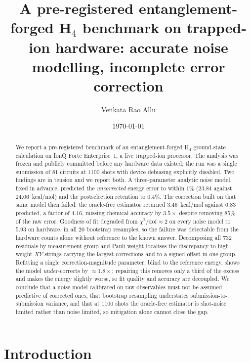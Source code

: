 \documentclass[aps,prx,twocolumn,superscriptaddress,nofootinbib,floatfix]{revtex4-2}
\begin{document}
\title{A pre-registered entanglement-forged H$_4$ benchmark on trapped-ion
hardware: accurate noise modelling, incomplete error correction}

\author{Venkata Rao Allu}

\date{\today}

\begin{abstract}
We report a pre-registered benchmark of an entanglement-forged H$_4$
ground-state calculation on IonQ Forte Enterprise~1, a live trapped-ion
processor. The analysis was frozen and publicly committed before any
hardware data existed; the run was a single submission of $81$ circuits at
$1100$ shots with device debiasing explicitly disabled. Two findings are in
tension and we report both. A three-parameter analytic noise model, fixed
in advance, predicted the \emph{uncorrected} energy error to within $1\%$
($23.84$ against $24.06$~kcal/mol) and the postselection retention to
$0.4\%$. The correction built on that same model then failed: the
oracle-free estimator returned $3.46$~kcal/mol against $0.83$ predicted, a
factor of $4.16$, missing chemical accuracy by $3.5\times$ despite removing
$85\%$ of the raw error. Goodness of fit degraded from
$\chi^2/\mathrm{dof}\approx2$ on every noise model to $5.93$ on hardware,
in all $20$ bootstrap resamples, so the failure was detectable from the
hardware counts alone without reference to the known answer. Decomposing
all $732$ residuals by measurement group and Pauli weight localises the
discrepancy to high-weight $XY$ strings carrying the largest corrections
and to a signed offset in one group. Refitting a single correction-magnitude
parameter, blind to the reference energy, shows the model
\emph{under}-corrects by $\approx1.8\times$; repairing this removes only a
third of the excess and makes the energy slightly worse, so fit quality and
accuracy are decoupled. We conclude that a noise model calibrated on raw
observables must not be assumed predictive of corrected ones, that
bootstrap resampling understates submission-to-submission variance, and
that at $1100$ shots the oracle-free estimator is shot-noise limited rather
than noise limited, so mitigation alone cannot close the gap.
\end{abstract}

\maketitle

\section{Introduction}
\end{document}

